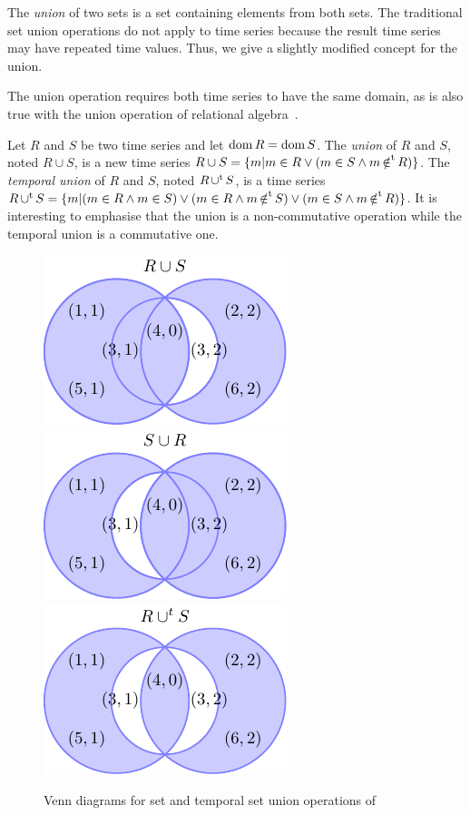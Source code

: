 The \emph{union} of two sets is a set containing elements from both
sets. The traditional set union operations do not apply to time series
because the result time series may have repeated time values.  Thus,
we give a slightly modified concept for the union.

The union operation requires both time series to have the same domain,
as is also true with the union operation of relational
algebra~\cite{date:introduction}.

Let $R$ and $S$ be two time series and let $\operatorname{dom} R =\operatorname{dom} S$.  The
\emph{union} of $R$ and $S$, noted $R\cup S$, is a new time series $R
\cup S = \{m|m\in R\vee (m\in S\wedge m \operatorname*{\notin^t} R)\}$.  The
\emph{temporal union} of $R$ and $S$, noted $R \operatorname*{\cup^t} S$, is a time
series $R \operatorname*{\cup^t} S = \{ m | (m \in R \wedge m \in S) \vee (m \in R
\wedge m \operatorname*{\notin^t} S) \vee (m \in S \wedge m \operatorname*{\notin^t} R) \}$.  It is
interesting to emphasise that the union is a non-commutative operation
while the temporal union is a commutative one.

\begin{figure}
  \centering
  \includegraphics{fig_model_venn.pdf}
  \includegraphics{fig_model_venn_reverse.pdf}
  \includegraphics{fig_model_venn2.pdf}
  \caption{Venn diagrams for set and temporal set union operations of
    }
  \label{fig:model:venn}
\end{figure}


